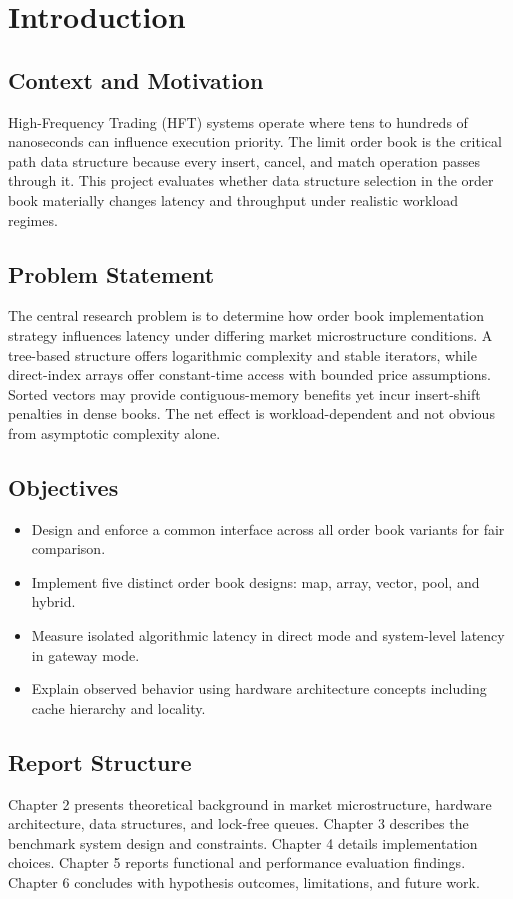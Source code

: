\chapter{Introduction}

\section{Context and Motivation}
High-Frequency Trading (HFT) systems operate where tens to hundreds of nanoseconds can influence execution priority. The limit order book is the critical path data structure because every insert, cancel, and match operation passes through it. This project evaluates whether data structure selection in the order book materially changes latency and throughput under realistic workload regimes.

\section{Problem Statement}
The central research problem is to determine how order book implementation strategy influences latency under differing market microstructure conditions. A tree-based structure offers logarithmic complexity and stable iterators, while direct-index arrays offer constant-time access with bounded price assumptions. Sorted vectors may provide contiguous-memory benefits yet incur insert-shift penalties in dense books. The net effect is workload-dependent and not obvious from asymptotic complexity alone.

\section{Objectives}
\begin{itemize}
  \item Design and enforce a common interface across all order book variants for fair comparison.
  \item Implement five distinct order book designs: map, array, vector, pool, and hybrid.
  \item Measure isolated algorithmic latency in direct mode and system-level latency in gateway mode.
  \item Explain observed behavior using hardware architecture concepts including cache hierarchy and locality.
\end{itemize}

\section{Report Structure}
Chapter 2 presents theoretical background in market microstructure, hardware architecture, data structures, and lock-free queues. Chapter 3 describes the benchmark system design and constraints. Chapter 4 details implementation choices. Chapter 5 reports functional and performance evaluation findings. Chapter 6 concludes with hypothesis outcomes, limitations, and future work.
